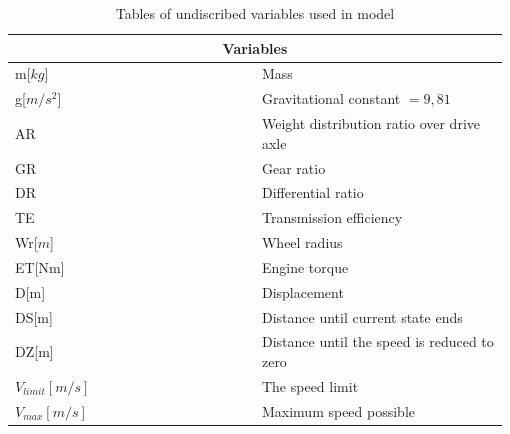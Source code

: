 \documentclass[noprint]{uit-thesis}
\begin{document}
\renewcommand{\arraystretch}{1.25}
\begin{table}[H]
\center
\begin{tabular}{|p{0.49\linewidth} | p{0.49\linewidth}|} 

 \hline
\multicolumn{2}{|c|}{Variables} \\
 \hline 
m[$kg$] & Mass \\
g[$m/s^2$] & Gravitational constant $= 9,81$ \\
AR & Weight distribution ratio over drive axle \\
GR & Gear ratio \\
DR & Differential ratio \\
TE & Transmission efficiency \\
Wr[$m$] & Wheel radius \\
ET[Nm] & Engine torque \\
D[m] & Displacement \\
DS[m] &  Distance until current state ends \\
DZ[m] & Distance until the speed is reduced to zero \\
$V_{limit} [m/s]$ & The speed limit \\
$V_{max} [m/s]$ & Maximum speed possible \\





 \hline
\end{tabular}
\caption{Tables of undiscribed variables used in model}
\label{tab:variables}
\end{table}

\end{document}
